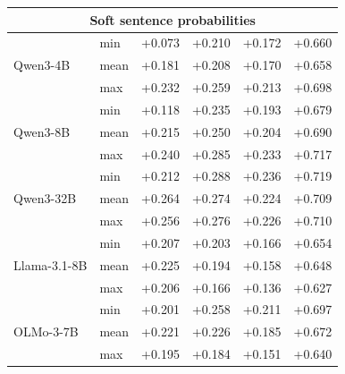 \begin{longtable}{@{}llcccc@{}}
\multicolumn{6}{c}{\textbf{Soft sentence probabilities}} \\
\midrule

\multirow{3}{*}{Qwen3-4B}
  & min & +0.073 & +0.210 & +0.172 & +0.660 \\
  & mean & +0.181 & +0.208 & +0.170 & +0.658 \\
  & max & +0.232 & +0.259 & +0.213 & +0.698 \\
\cmidrule(l){2-6}
\multirow{3}{*}{Qwen3-8B}
  & min & +0.118 & +0.235 & +0.193 & +0.679 \\
  & mean & +0.215 & +0.250 & +0.204 & +0.690 \\
  & max & +0.240 & +0.285 & +0.233 & +0.717 \\
\cmidrule(l){2-6}
\multirow{3}{*}{Qwen3-32B}
  & min & +0.212 & +0.288 & +0.236 & +0.719 \\
  & mean & +0.264 & +0.274 & +0.224 & +0.709 \\
  & max & +0.256 & +0.276 & +0.226 & +0.710 \\
\cmidrule(l){2-6}
\multirow{3}{*}{Llama-3.1-8B}
  & min & +0.207 & +0.203 & +0.166 & +0.654 \\
  & mean & +0.225 & +0.194 & +0.158 & +0.648 \\
  & max & +0.206 & +0.166 & +0.136 & +0.627 \\
\cmidrule(l){2-6}
\multirow{3}{*}{OLMo-3-7B}
  & min & +0.201 & +0.258 & +0.211 & +0.697 \\
  & mean & +0.221 & +0.226 & +0.185 & +0.672 \\
  & max & +0.195 & +0.184 & +0.151 & +0.640 \\
\midrule

\end{longtable}
